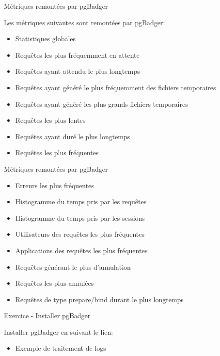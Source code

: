 \begin{frame}{Métriques remontées par pgBadger}

   Les métriques suivantes sont remontées par pgBadger:
   \begin{itemize}
      \item Statistiques globales
      \item Requêtes les plus fréquemment en attente
      \item Requêtes ayant attendu le plus longtemps
      \item Requêtes ayant généré le plus fréquemment des fichiers temporaires
      \item Requêtes ayant généré les plus grands fichiers temporaires
      \item Requêtes les plus lentes
      \item Requêtes ayant duré le plus longtemps
      \item Requêtes les plus fréquentes
   \end{itemize}

\end{frame}


\begin{frame}{Métriques remontées par pgBadger}

   \begin{itemize}
      \item Erreurs les plus fréquentes
      \item Histogramme du temps pris par les requêtes
      \item Histogramme du temps pris par les sessions
      \item Utilisateurs des requêtes les plus fréquentes
      \item Applications des requêtes les plus fréquentes
      \item Requêtes générant le plus d'annulation
      \item Requêtes les plus annulées
      \item Requêtes de type prepare/bind durant le plus longtemps
   \end{itemize}

\end{frame}


\begin{frame}{Exercice - Installer pgBadger}

Installer pgBadger en suivant le lien:
\begin{toile}
\end{toile}

   \begin{itemize}
      \item Exemple de traitement de logs
   \end{itemize}

\end{frame}

